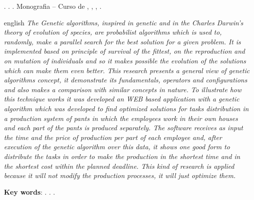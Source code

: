 
\begin{OnehalfSpacing} 

\noindent \imprimirAutorCitacaoMaiuscula. {\bfseries\imprimirtitulo}. {\imprimirdata}.  Monografia -- Curso de {\MakeUppercase\imprimircurso}, {\imprimirinstituicao}, {\imprimirlocal}, {\imprimirdata}.

\vspace{\onelineskip}
\vspace{\onelineskip}
\vspace{\onelineskip}
\vspace{\onelineskip}

\begin{resumo}[Abstract]%
\begin{otherlanguage*}{english}%
\textit{
\noindent The Genetic algorithms, inspired in genetic and in the Charles Darwin's theory of evolution of species,
are probabilist algorithms which is used to, randomly, make a parallel search for the best solution for a given problem. 
It is implemented based on principle of survival of the fittest, on the reproduction and on mutation of individuals and 
so it makes possible the evolution of the solutions which can make them even better. This research presents a general view 
of genetic algorithms concept, it demonstrate its fundamentals, operators and configurations and also makes a comparison 
with similar concepts in nature. To illustrate how this technique works it was developed an WEB based application with a 
genetic algorithm which was developed to find optimized solutions for tasks distribution in a production system of pants in 
which the employees work in their own houses and each part of the pants is produced separately. The software receives as 
input the time and the price of production per part of each employee and, after execution of the genetic algorithm over 
this data, it shows one good form to distribute the tasks in order to make the production in the shortest time and in the 
shortest cost within the planned deadline. This kind of research is applied because it will not modify the production processes, 
it will just optimize them.
}

\vspace{\onelineskip}
\vspace*{\fill}
\noindent \textbf{Key words}: \imprimirKeyWordOne. \imprimirKeyWordTwo. \imprimirKeyWordThree.
\end{otherlanguage*}
\vspace{\onelineskip}
\end{resumo}

\end{OnehalfSpacing}
